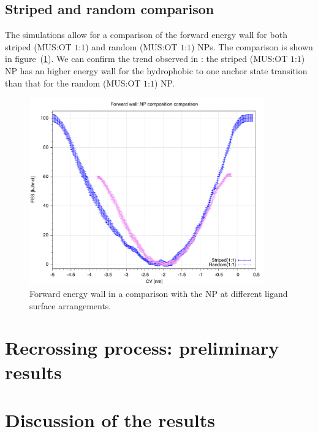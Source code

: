 \subsection{Striped and random comparison}
The simulations allow for a comparison of the forward energy wall for both striped (\ac{MUS}:\ac{OT} $1$:$1$) and random (\ac{MUS}:\ac{OT} $1$:$1$) \acp{NP}. The comparison is shown in figure~(\ref{fig:forwardWallRP}). We can confirm the trend observed in \cite{ourPaper}: the striped (\ac{MUS}:\ac{OT} $1$:$1$) \ac{NP} has an higher energy wall for the hydrophobic to one anchor state transition than that for the random (\ac{MUS}:\ac{OT} $1$:$1$) \ac{NP}.
\begin{figure}[h!t]
	\centering
	\includegraphics[width=0.9\textwidth]{./img/results/FESModelComparison/forwardWallRP}
	\caption{Forward energy wall in a comparison with the \ac{NP} at different ligand surface arrangements.}
	\label{fig:forwardWallRP}
\end{figure}
	
\section{Recrossing process: preliminary results}


\section{Discussion of the results}


